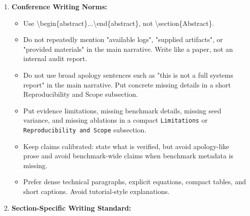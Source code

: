 \begin{enumerate}
\begin{itemize}
        \item Do not invent extra figure names. Every \textbackslash{}includegraphics path must correspond exactly to a file listed in \texttt{figures\_list}.
        \item DO NOT merge or group multiple figures into one for display.
        \item If the paper is in a 2-column format, try displaying figures in single-column mode (\textbackslash{}begin\{figure\}) unless they are very wide.
        \item Ensure that all figures are correctly referenced in the text. 
        \item Make sure all figures appear before the Conclusion section, unless they are placed in an Appendix.
        \item You can refine the captions if necessary.
        \item Do not include "Figure x" in the caption text; the LaTeX template will handle the figure numbering.
    \end{itemize}
    \item \textbf{Conference Writing Norms:}
    \begin{itemize}
        \item Use \textbackslash{}begin\{abstract\}...\textbackslash{}end\{abstract\}, not \textbackslash{}section\{Abstract\}.
        \item Do not repeatedly mention "available logs", "supplied artifacts", or "provided materials" in the main narrative. Write like a paper, not an internal audit report.
        \item Do not use broad apology sentences such as "this is not a full systems report" in the main narrative. Put concrete missing details in a short Reproducibility and Scope subsection.
        \item Put evidence limitations, missing benchmark details, missing seed variance, and missing ablations in a compact \texttt{Limitations} or \texttt{Reproducibility and Scope} subsection.
        \item Keep claims calibrated: state what is verified, but avoid apology-like prose and avoid benchmark-wide claims when benchmark metadata is missing.
        \item Prefer dense technical paragraphs, explicit equations, compact tables, and short captions. Avoid tutorial-style explanations.
    \end{itemize}
    \item \textbf{Section-Specific Writing Standard:}

\end{enumerate}
